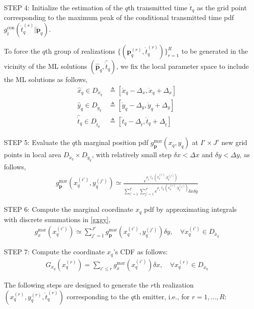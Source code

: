 \documentclass[review]{elsarticle}
\begin{document}
STEP 4: Initialize the estimation of the $q$th transmitted time $\mathring{t}_q$ as the grid point corresponding to the maximum peak of the conditional transmitted time pdf $g_{\mathring{t}}^{\text{con}}(\mathring{t}_q^{(s)} \vert \mathring{\boldsymbol{p}}_q)$.

To force the $q$th group of realizations $\lbrace(\boldsymbol{p}_q^{(r)},\mathring{t}_q^{(r)})\rbrace_{r=1}^{R}$ to be generated in the vicinity of the ML solutions $(\hat{\boldsymbol{p}}_q,\hat{\mathring{t}}_q)$, we fix the local parameter space to include the ML solutions as follows,
\begin{align}
    \hat{x}_q\in D_{\mathring{x}_q}&\triangleq[\mathring{x}_q-\Delta_x,\mathring{x}_q+\Delta_x]\\
    \hat{y}_q\in D_{\mathring{y}_q}&\triangleq[\mathring{y}_q-\Delta_y,\mathring{y}_q+\Delta_y]\\
    \hat{\mathring{t}}_q\in D_{\mathring{t}_q}&\triangleq[\mathring{t}_q-\Delta_{\mathring{t}},\mathring{t}_q+\Delta_{\mathring{t}}]
\end{align}

STEP 5: Evaluate the $q$th marginal position pdf $g_{\boldsymbol{p}}^{\text{mar}}(x_q,y_q)$ at $I'\times J'$ new grid points in local area $D_{\mathring{x}_q}\times D_{\mathring{y}_q}$, with relatively small step $\delta x<\Delta x$ and $\delta y<\Delta y$, as follows,
\begin{align}\label{step5}
    g_{\boldsymbol{p}}^{\text{mar}}(x_q^{(i')},y_q^{(j')})\simeq\frac{e^{\rho_1\ell_q (x_q^{(i')},y_q^{(j')})}}{\sum_{i'=1}^{I'}\sum_{j'=1}^{J'}e^{\rho_1\ell_q (x_q^{(i')},y_q^{(j')})}\delta x\delta y}
\end{align}

STEP 6: Compute the marginal coordinate $x_q$ pdf by approximating integrals with discrete summations in \eqref{gxgy},
\begin{align}
    g_{x}^{\text{mar}}(x_q^{(i')})\simeq \sum_{j'=1}^{J'} g_{\boldsymbol{p}}^{\text{mar}}(x_q^{(i')},y_q^{(j')})\delta y, \quad \forall x_q^{(i')}\in D_{\mathring{x}_q}
\end{align}

STEP 7: Compute the coordinate $x_q$'s CDF as follows:
\begin{align}\label{Gxq}
    G_{x_q}(x_q^{(r)})=\sum_{i'\leq r} g_{x}^{\text{mar}}(x_q^{(i')})\delta x, \quad \forall x_q^{(r)}\in D_{\mathring{x}_q} 
\end{align}

The following steps are designed to generate the $r$th realization $(x_q^{(r)},y_q^{(r)},\mathring{t}_q^{(r)})$ corresponding to the $q$th emitter, i.e., for $r=1,...,R$:
\end{document}
